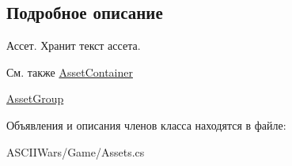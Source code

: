 \subsection{Подробное описание}
Ассет. Хранит текст ассета. 

\begin{DoxySeeAlso}{См. также}
\hyperlink{class_a_s_c_i_i_wars_1_1_game_1_1_asset_container}{Asset\+Container} 

\hyperlink{class_a_s_c_i_i_wars_1_1_game_1_1_asset_group}{Asset\+Group} 
\end{DoxySeeAlso}


Объявления и описания членов класса находятся в файле\+:\begin{DoxyCompactItemize}
\item 
A\+S\+C\+I\+I\+Wars/\+Game/Assets.\+cs\end{DoxyCompactItemize}
